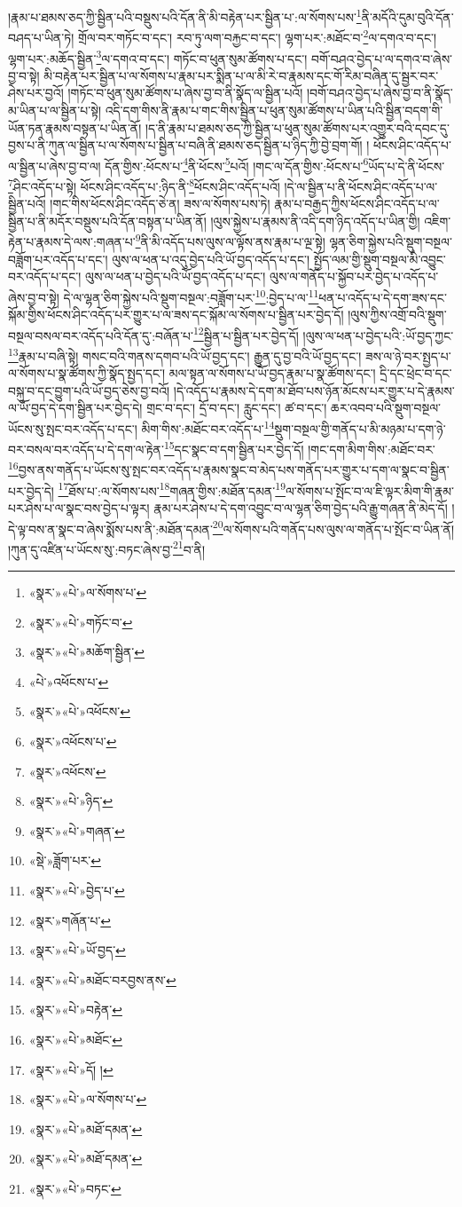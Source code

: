།རྣམ་པ་ཐམས་ཅད་ཀྱི་སྦྱིན་པའི་བསྡུས་པའི་དོན་ནི་མི་བརྟེན་པར་སྦྱིན་པ་:ལ་སོགས་པས་\footnote{«སྣར་»«པེ་»ལ་སོགས་པ་}ནི་མདོའི་དུམ་བུའི་དོན་བཤད་པ་ཡིན་ཏེ། གྲོལ་བར་གཏོང་བ་དང་། རབ་ཏུ་ལག་བརྐྱང་བ་དང་། ལྷག་པར་:མཐོང་བ་\footnote{«སྣར་»«པེ་»གཏོང་བ་}ལ་དགའ་བ་དང་། ལྷག་པར་:མཆོད་སྦྱིན་\footnote{«སྣར་»«པེ་»མཆོག་སྦྱིན་}ལ་དགའ་བ་དང་། གཏོང་བ་ཕུན་སུམ་ཚོགས་པ་དང་། བགོ་བཤའ་བྱེད་པ་ལ་དགའ་བ་ཞེས་བྱ་བ་སྟེ། མི་བརྟེན་པར་སྦྱིན་པ་ལ་སོགས་པ་རྣམ་པར་སྨིན་པ་ལ་མི་རེ་བ་རྣམས་དང་གོ་རིམ་བཞིན་དུ་སྦྱར་བར་ཤེས་པར་བྱའོ། །གཏོང་བ་ཕུན་སུམ་ཚོགས་པ་ཞེས་བྱ་བ་ནི་སྣོད་ལ་སྦྱིན་པའོ། །བགོ་བཤའ་བྱེད་པ་ཞེས་བྱ་བ་ནི་སྣོད་མ་ཡིན་པ་ལ་སྦྱིན་པ་སྟེ། འདི་དག་གིས་ནི་རྣམ་པ་གང་གིས་སྦྱིན་པ་ཕུན་སུམ་ཚོགས་པ་ཡིན་པའི་སྦྱིན་བདག་གི་ཡོན་ཏན་རྣམས་བསྟན་པ་ཡིན་ནོ། །ད་ནི་རྣམ་པ་ཐམས་ཅད་ཀྱི་སྦྱིན་པ་ཕུན་སུམ་ཚོགས་པར་འགྱུར་བའི་དབང་དུ་བྱས་པ་ནི་ཀུན་ལ་སྦྱིན་པ་ལ་སོགས་པ་སྦྱིན་པ་བཞི་ནི་ཐམས་ཅད་སྦྱིན་པ་ཉིད་ཀྱི་བྱེ་བྲག་གོ། །
ཕོངས་ཤིང་འདོད་པ་ལ་སྦྱིན་པ་ཞེས་བྱ་བ་ལ། དོན་གྱིས་:ཕོངས་པ་\footnote{«པེ་»འཕོངས་པ་}ནི་ཕོངས་\footnote{«སྣར་»«པེ་»འཕོངས་}པའོ། །གང་ལ་དོན་གྱིས་:ཕོངས་པ་\footnote{«སྣར་»འཕོངས་པ་}ཡོད་པ་དེ་ནི་ཕོངས་\footnote{«སྣར་»འཕོངས་}ཤིང་འདོད་པ་སྟེ། ཕོངས་ཤིང་འདོད་པ་:ཉིད་ནི་\footnote{«སྣར་»«པེ་»ཉིད་}ཕོངས་ཤིང་འདོད་པའོ། །དེ་ལ་སྦྱིན་པ་ནི་ཕོངས་ཤིང་འདོད་པ་ལ་སྦྱིན་པའོ། །གང་གིས་ཕོངས་ཤིང་འདོད་ཅེ་ན། ཟས་ལ་སོགས་པས་ཏེ། རྣམ་པ་བརྒྱད་ཀྱིས་ཕོངས་ཤིང་འདོད་པ་ལ་སྦྱིན་པ་ནི་མདོར་བསྡུས་པའི་དོན་བསྟན་པ་ཡིན་ནོ། །ལུས་སྐྱེས་པ་རྣམས་ནི་འདི་དག་ཉིད་འདོད་པ་ཡིན་གྱི། འཇིག་རྟེན་པ་རྣམས་དེ་ལས་:གཞན་པ་\footnote{«སྣར་»«པེ་»གཞན་}ནི་མི་འདོད་པས་ལུས་ལ་ལྟོས་ནས་རྣམ་པ་ལྔ་སྟེ། ལྷན་ཅིག་སྐྱེས་པའི་སྡུག་བསྔལ་བཟློག་པར་འདོད་པ་དང་། ལུས་ལ་ཕན་པ་འདུ་བྱེད་པའི་ཡོ་བྱད་འདོད་པ་དང་། སྤྱོད་ལམ་གྱི་སྡུག་བསྔལ་མི་འབྱུང་བར་འདོད་པ་དང་། ལུས་ལ་ཕན་པ་བྱེད་པའི་ཡོ་བྱད་འདོད་པ་དང་། ལུས་ལ་གནོད་པ་སྐྱོབ་པར་བྱེད་པ་འདོད་པ་ཞེས་བྱ་བ་སྟེ། དེ་ལ་ལྷན་ཅིག་སྐྱེས་པའི་སྡུག་བསྔལ་:བཟློག་པར་\footnote{«སྡེ་»ཟློག་པར་}:བྱེད་པ་ལ་\footnote{«སྣར་»«པེ་»བྱེད་པ་}ཕན་པ་འདོད་པ་དེ་དག་ཟས་དང་སྐོམ་གྱིས་ཕོངས་ཤིང་འདོད་པར་གྱུར་པ་ལ་ཟས་དང་སྐོམ་ལ་སོགས་པ་སྦྱིན་པར་བྱེད་དོ། །ལུས་ཀྱིས་འགྲོ་བའི་སྡུག་བསྔལ་བསལ་བར་འདོད་པའི་དོན་དུ་:བཞོན་པ་\footnote{«སྣར་»གཞོན་པ་}སྦྱིན་པ་སྦྱིན་པར་བྱེད་དོ། །ལུས་ལ་ཕན་པ་བྱེད་པའི་:ཡོ་བྱད་ཀྱང་\footnote{«སྣར་»«པེ་»ཡོ་བྱད་}རྣམ་པ་བཞི་སྟེ། གསང་བའི་གནས་དགབ་པའི་ཡོ་བྱད་དང་། རྒྱུན་དུ་བྱ་བའི་ཡོ་བྱད་དང་། ཟས་ལ་ཉེ་བར་སྤྱད་པ་ལ་སོགས་པ་སྣ་ཚོགས་ཀྱི་སྣོད་སྤྱད་དང་། མལ་སྟན་ལ་སོགས་པ་ཡོ་བྱད་རྣམ་པ་སྣ་ཚོགས་དང་། དྲི་དང་ཕྲེང་བ་དང་བསྐུ་བ་དང་བྱུག་པའི་ཡོ་བྱད་ཅེས་བྱ་བའོ། །དེ་འདོད་པ་རྣམས་དེ་དག་མ་ཐོབ་པས་ཉོན་མོངས་པར་གྱུར་པ་དེ་རྣམས་ལ་ཡོ་བྱད་དེ་དག་སྦྱིན་པར་བྱེད་དེ། གྲང་བ་དང་། དྲོ་བ་དང་། རླུང་དང་། ཚ་བ་དང་། ཆར་འབབ་པའི་སྡུག་བསྔལ་ཡོངས་སུ་སྤང་བར་འདོད་པ་དང་། མིག་གིས་:མཐོང་བར་འདོད་པ་\footnote{«སྣར་»«པེ་»མཐོང་བརབྱས་ནས་}སྡུག་བསྔལ་གྱི་གནོད་པ་མི་མཉམ་པ་དག་ཉེ་བར་བསལ་བར་འདོད་པ་དེ་དག་ལ་རྟེན་\footnote{«སྣར་»«པེ་»བརྟེན་}དང་སྣང་བ་དག་སྦྱིན་པར་བྱེད་དོ། །གང་དག་མིག་གིས་:མཐོང་བར་\footnote{«སྣར་»«པེ་»མཐོང་}བྱས་ནས་གནོད་པ་ཡོངས་སུ་སྤང་བར་འདོད་པ་རྣམས་སྣང་བ་མེད་པས་གནོད་པར་གྱུར་པ་དག་ལ་སྣང་བ་སྦྱིན་པར་བྱེད་དེ། \footnote{«སྣར་»«པེ་»དོ། ། }ཐོས་པ་:ལ་སོགས་པས་\footnote{«སྣར་»«པེ་»ལ་སོགས་པ་}གཞན་གྱིས་:མཐོན་དམན་\footnote{«སྣར་»«པེ་»མཐོ་དམན་}ལ་སོགས་པ་སྤོང་བ་ལ་ཇི་ལྟར་མིག་གི་རྣམ་པར་ཤེས་པ་ལ་སྣང་བས་བྱེད་པ་ལྟར། རྣམ་པར་ཤེས་པ་དེ་དག་འབྱུང་བ་ལ་ལྷན་ཅིག་བྱེད་པའི་རྒྱུ་གཞན་ནི་མེད་དོ། །དེ་ལྟ་བས་ན་སྣང་བ་ཞེས་སྨོས་པས་ནི་:མཐོན་དམན་\footnote{«སྣར་»«པེ་»མཐོ་དམན་}ལ་སོགས་པའི་གནོད་པས་ལུས་ལ་གནོད་པ་སྤོང་བ་ཡིན་ནོ། །ཀུན་དུ་འཛིན་པ་ཡོངས་སུ་:བཏང་ཞེས་བྱ་\footnote{«སྣར་»«པེ་»བཏང་}བ་ནི། 